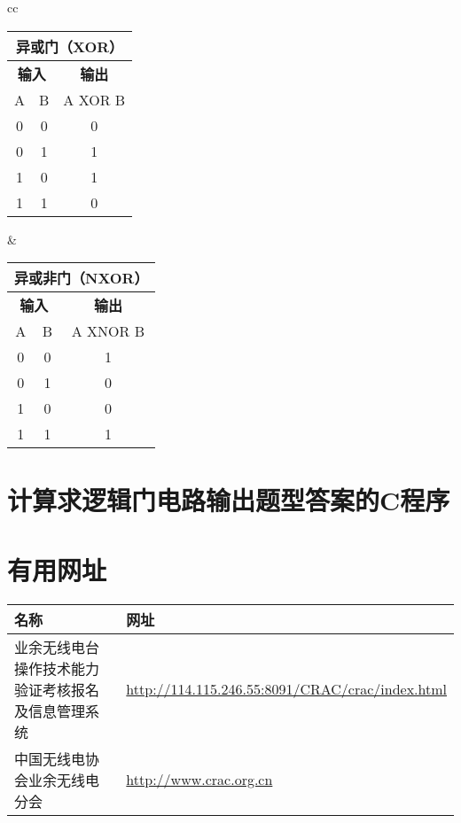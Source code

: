 \bigskip

\begin{tabular}{cc}%
	\begin{tabular}{|c|c|c|}
		\multicolumn{3}{c}{\textbf{异或门（XOR）}} \\
		\hline
		\multicolumn{2}{|c|}{\textbf{输入}} & \textbf{输出} \\
		\hline
		A & B & A XOR B \\
		\hline
		0 & 0 & 0 \\
		\hline
		0 & 1 & 1 \\
		\hline
		1 & 0 & 1 \\
		\hline
		1 & 1 & 0 \\
		\hline
	\end{tabular} &
	\begin{tabular}{|c|c|c|}
		\multicolumn{3}{c}{\textbf{异或非门（NXOR）}} \\
		\hline
		\multicolumn{2}{|c|}{\textbf{输入}} & \textbf{输出} \\
		\hline
		A & B & A XNOR B \\
		\hline
		0 & 0 & 1 \\
		\hline
		0 & 1 & 0 \\
		\hline
		1 & 0 & 0 \\
		\hline
		1 & 1 & 1 \\
		\hline
	\end{tabular} \tabularnewline
\end{tabular}

\newpage

\section{计算求逻辑门电路输出题型答案的C程序}



\newpage

\section{有用网址}

\begin{longtable}{|p{8cm}|p{8cm}|}
	\hline
	\textbf{名称} & \textbf{网址} \\
	\hline
	业余无线电台操作技术能力验证考核报名及信息管理系统 & \url{http://114.115.246.55:8091/CRAC/crac/index.html} \\
	\hline
	中国无线电协会业余无线电分会 & \url{http://www.crac.org.cn} \\
	\hline
\end{longtable}
